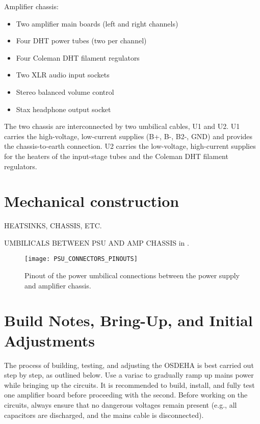 Amplifier chassis:
\begin{itemize}
\item Two amplifier main boards (left and right channels)
\item Four DHT power tubes (two per channel)
\item Four Coleman DHT filament regulators
\item Two XLR audio input sockets
\item Stereo balanced volume control
\item Stax headphone output socket
\end{itemize}

The two chassis are interconnected by two umbilical cables, U1 and U2. U1 carries the high-voltage, low-current supplies (B+, B-, B2-, GND) and provides the chassis-to-earth connection. U2 carries the low-voltage, high-current supplies for the heaters of the input-stage tubes and the Coleman DHT filament regulators.


\section{Mechanical construction}

HEATSINKS, CHASSIS, ETC.

UMBILICALS BETWEEN PSU AND AMP CHASSIS in .

\begin{figure}
\begin{center}
\texttt{[image: PSU\_CONNECTORS\_PINOUTS]}
\caption{Pinout of the power umbilical connections between the power supply and amplifier chassis.}
\end{center}
\end{figure}


\section{Build Notes, Bring-Up, and Initial Adjustments}

The process of building, testing, and adjusting the OSDEHA is best carried out step by step, as outlined below. Use a variac to gradually ramp up mains power while bringing up the circuits. It is recommended to build, install, and fully test one amplifier board before proceeding with the second. Before working on the circuits, always ensure that no dangerous voltages remain present (e.g., all capacitors are discharged, and the mains cable is disconnected).

